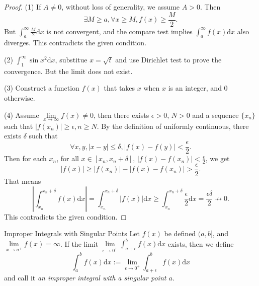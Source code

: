 \begin{proof}
  (1) If $A \neq 0$, without loss of generality, we assume $A > 0$.
  Then
  \begin{equation}
    \exists M \geq a, \forall x \geq M, f(x) \geq \frac{M}{2}.
  \end{equation}
  But $\int_a^{\infty}\frac{M}{2}\mathrm{d} x$ is not convergent,
  and the compare test implies $\int_a^{\infty}f(x)\mathrm{d} x$ also diverges.
  This contradicts the given condition.

  (2) $\int_1^{\infty} \sin x^2\mathrm{d} x$, substitue $x = \sqrt{t}$ and use Dirichlet
  test to prove the convergence. But the limit does not exist.

  (3) Construct a function $f(x)$ that takes $x$ when $x$ is an integer, and $0$ otherwise.

  (4) Assume $\lim \limits _{x \rightarrow \infty}f(x) \neq 0$, then there
  exists $\epsilon > 0$, $N > 0$ and a sequence $\{x_n\}$ such that $|f(x_n)| \geq
  \epsilon, n \geq N$.
  By the definition of uniformly continuous, there exists $\delta$ such that
  \begin{equation}
    \forall x, y, |x - y| \leq \delta, |f(x) - f(y)| < \frac{\epsilon}{2}.
  \end{equation}
  Then for each $x_n$, for all $x \in [x_n, x_n + \delta]$,
  $|f(x) - f(x_n)| < \frac{\epsilon}{2}$, we get
  \begin{equation}
    |f(x)| \geq |f(x_n)| - |f(x) - f(x_n)| > \frac{\epsilon}{2}.
  \end{equation}
  That means
  \begin{equation}
    \left| \int_{x_n}^{x_n + \delta} f(x)\mathrm{d} x \right|
    = \int_{x_n}^{x_n + \delta}|f(x)|\mathrm{d} x
    \geq \int_{x_n}^{x_n + \delta} \frac{\epsilon}{2} \mathrm{d} x
     = \frac{\epsilon \delta}{2} \not \rightarrow 0.
  \end{equation}
  This contradicts the given condition.
\end{proof}

\begin{definition}{Improper Integrals with Singular Points}{}
  Let $f(x)$ be defined $(a, b]$,
  and $\lim \limits _{x \rightarrow a^+}f(x) = \infty$.
  If the limit $\lim \limits _{\epsilon \rightarrow 0^+} \int_{a+\epsilon}^b
  f(x) \mathrm{d} x$ exists,
  then we define
  \begin{equation}
    \int_a^b f(x) \mathrm{d} x := \lim \limits _{\epsilon \rightarrow 0^+} \int_{a+\epsilon}^b
  f(x) \mathrm{d} x
  \end{equation}
  and call it \emph{an improper integral with a singular point $a$}.
\end{definition}

